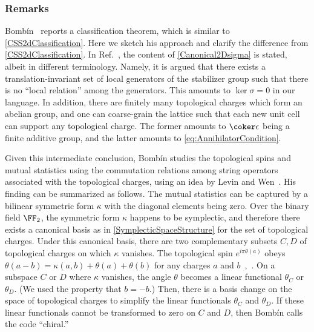 \subsubsection{Remarks}



\begin{rem}\label{BombinResult}

Bomb\'in~\cite{Bombin2011Structure} reports a classification theorem,
which is similar to \ref{CSS2dClassification}.
Here we sketch his approach and clarify the difference from \ref{CSS2dClassification}.
In Ref.~\cite{Bombin2011Structure},
the content of \ref{Canonical2Dsigma} is stated,
albeit in different terminology.
Namely, it is argued that there exists a translation-invariant set 
of local generators of the stabilizer group such that there is no ``local relation''
among the generators.
This amounts to $\ker \sigma = 0$ in our language.
In addition, 
there are finitely many topological charges which form an abelian group,
and one can coarse-grain the lattice
such that each new unit cell can support any topological charge.
The former amounts to $\coker \epsilon$ being a finite additive group,
and the latter amounts to \eqref{eq:AnnihilatorCondition}.

Given this intermediate conclusion,
Bomb\'in studies the topological spins and mutual statistics
using the commutation relations among string operators
associated with the topological charges,
using an idea by Levin and Wen~\cite{LevinWen2003Fermions}.
His finding can be summarized as follows.
The mutual statistics can be captured by
a bilinear symmetric form $\kappa$
with the diagonal elements being zero.
Over the binary field $\FF_2$,
the symmetric form $\kappa$ happens to be symplectic,
and therefore there exists a canonical basis as in \ref{SymplecticSpaceStructure}
for the set of topological charges.
Under this canonical basis,
there are two complementary subsets $C, D$ of topological charges
on which $\kappa$ vanishes.
The topological spin $e^{i \pi \theta(a)}$
obeys 
$\theta( a - b ) = \kappa(a,b) + \theta(a) + \theta(b)$
for any charges $a$ and $b$~\cite[Eq.~(3.1.2)]{BakalovKirillov2001},~\cite[Eq.~(223)]{Kitaev2006Anyons}.
On a subspace $C$ or $D$ where $\kappa$ vanishes,
the angle $\theta$
becomes a linear functional $\theta_C$ or $\theta_D$.
(We used the property that $b = -b$.)
Then, there is a basis change on the space of topological charges
to simplify the linear functionals $\theta_C$ and $\theta_D$.
If these linear functionals cannot be transformed to zero on $C$ and $D$,
then Bomb\'in calls the code ``chiral.''


\end{rem}
